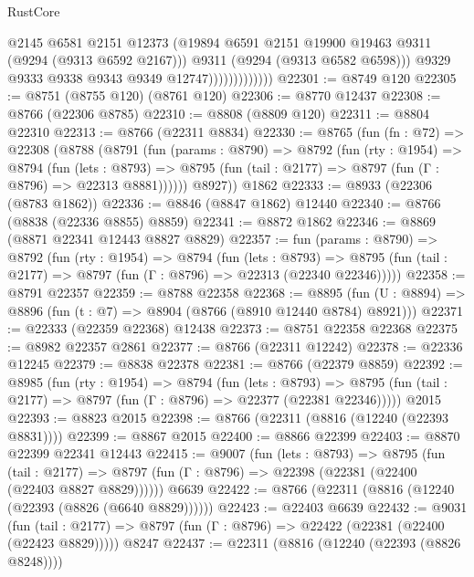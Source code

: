 \begin{lexlean}{RustCore}
\begin{coremodule}
                                @2145
                                @6581
                                @2151
                                @12373
                                (@19894 @6591 @2151 @19900 @19463 @9311 (@9294 (@9313 @6592 @2167)))
                                @9311
                                (@9294 (@9313 @6582 @6598)))
                              @9329
                              @9333
                              @9338
                              @9343
                              @9349
                              @12747)))))))))))))
@22301 := @8749 @120
@22305 := @8751 (@8755 @120) (@8761 @120)
@22306 := @8770 @12437
@22308 := @8766 (@22306 @8785)
@22310 := @8808 (@8809 @120)
@22311 := @8804 @22310
@22313 := @8766 (@22311 @8834)
@22330 := @8765
    (fun (fn : @72) =>
    @22308
      (@8788
        (@8791
          (fun (params : @8790) =>
          @8792
            (fun (rty : @1954) =>
            @8794
              (fun (lets : @8793) =>
              @8795 (fun (tail : @2177) => @8797 (fun (Γ : @8796) => @22313 @8881))))))
        @8927))
    @1862
@22333 := @8933 (@22306 (@8783 @1862))
@22336 := @8846 (@8847 @1862) @12440
@22340 := @8766 (@8838 (@22336 @8855) @8859)
@22341 := @8872 @1862
@22346 := @8869 (@8871 @22341 @12443 @8827 @8829)
@22357 := fun (params : @8790) =>
  @8792
    (fun (rty : @1954) =>
    @8794
      (fun (lets : @8793) =>
      @8795 (fun (tail : @2177) => @8797 (fun (Γ : @8796) => @22313 (@22340 @22346)))))
@22358 := @8791 @22357
@22359 := @8788 @22358
@22368 := @8895
    (fun (U : @8894) => @8896 (fun (t : @7) => @8904 (@8766 (@8910 @12440 @8784) @8921)))
@22371 := @22333 (@22359 @22368) @12438
@22373 := @8751 @22358 @22368
@22375 := @8982 @22357 @2861
@22377 := @8766 (@22311 @12242)
@22378 := @22336 @12245
@22379 := @8838 @22378
@22381 := @8766 (@22379 @8859)
@22392 := @8985
    (fun (rty : @1954) =>
    @8794
      (fun (lets : @8793) =>
      @8795 (fun (tail : @2177) => @8797 (fun (Γ : @8796) => @22377 (@22381 @22346)))))
    @2015
@22393 := @8823 @2015
@22398 := @8766 (@22311 (@8816 (@12240 (@22393 @8831))))
@22399 := @8867 @2015
@22400 := @8866 @22399
@22403 := @8870 @22399 @22341 @12443
@22415 := @9007
    (fun (lets : @8793) =>
    @8795
      (fun (tail : @2177) =>
      @8797 (fun (Γ : @8796) => @22398 (@22381 (@22400 (@22403 @8827 @8829))))))
    @6639
@22422 := @8766 (@22311 (@8816 (@12240 (@22393 (@8826 (@6640 @8829))))))
@22423 := @22403 @6639
@22432 := @9031
    (fun (tail : @2177) => @8797 (fun (Γ : @8796) => @22422 (@22381 (@22400 (@22423 @8829)))))
    @8247
@22437 := @22311 (@8816 (@12240 (@22393 (@8826 @8248))))

\end{coremodule}
\end{lexlean}
